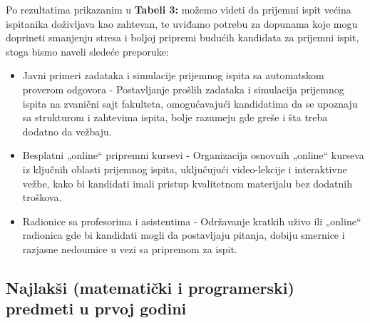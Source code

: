 \documentclass[a4paper]{article}
\begin{document}
Po rezultatima prikazanim u \textbf{Tabeli 3:} možemo videti da prijemni ispit većina ispitanika doživljava kao zahtevan, te uviđamo potrebu za dopunama koje mogu doprineti smanjenju stresa i boljoj pripremi budućih kandidata za prijemni ispit, stoga bismo naveli sledeće preporuke:\\

\begin{itemize}
    \item Javni primeri zadataka i simulacije prijemnog ispita sa automatskom proverom odgovora - Postavljanje prošlih zadataka i simulacija prijemnog ispita na zvanični sajt fakulteta, omogućavajući kandidatima da se upoznaju sa strukturom i zahtevima ispita, bolje razumeju gde greše i šta treba dodatno da vežbaju.
    \item Besplatni „online“ pripremni kursevi - Organizacija osnovnih „online“ kurseva iz ključnih oblasti prijemnog ispita, uključujući video-lekcije i interaktivne vežbe, kako bi kandidati imali pristup kvalitetnom materijalu bez dodatnih troškova.
    \item Radionice sa profesorima i asistentima - Održavanje kratkih uživo ili „online“ radionica gde bi kandidati mogli da postavljaju pitanja, dobiju smernice i razjasne nedoumice u vezi sa pripremom za ispit.\\
\end{itemize}

\begin{table}[H]
\centering %
\caption{Ocena prijemnog ispita}
\end{table}

\subsection{\textbf{Najlakši (matematički i programerski) predmeti u prvoj godini}}
\end{document}
